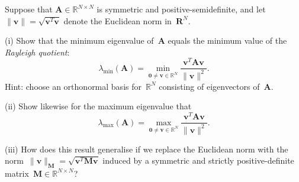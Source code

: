 \begin{Exercises}

\exercise\label{ex: quadratic form}
Suppose that $\boldsymbol{A}\in\mathbb{R}^{N\times N}$ is symmetric and 
positive-semidefinite, and let 
$\|\boldsymbol{v}\|=\sqrt{\boldsymbol{v}^T\boldsymbol{v}}$ denote the 
Euclidean norm in~$\boldsymbol{R}^N$.  
\begin{description}
\item{(i)}
Show that the minimum eigenvalue of~$\boldsymbol{A}$ equals the minimum value 
of the \emph{Rayleigh quotient}:
\[
\lambda_{\min}(\boldsymbol{A})
    =\min_{\boldsymbol{0}\ne\boldsymbol{v}\in\mathbb{R}^N}
    \frac{\boldsymbol{v}^T\boldsymbol{A}\boldsymbol{v}}{\|\boldsymbol{v}\|^2}.
\]
Hint: choose an orthonormal basis for~$\mathbb{R}^N$ consisting of eigenvectors 
of~$\boldsymbol{A}$.
\item{(ii)} Show likewise for the maximum eigenvalue that
\[
\lambda_{\max}(\boldsymbol{A})
    =\max_{\boldsymbol{0}\ne\boldsymbol{v}\in\mathbb{R}^N}
    \frac{\boldsymbol{v}^T\boldsymbol{A}\boldsymbol{v}}{\|\boldsymbol{v}\|^2}.
\]
\item{(iii)} How does this result generalise if we replace the Euclidean norm 
with the norm~$\|\boldsymbol{v}\|_{\boldsymbol{M}}=\sqrt{\boldsymbol{v}^T
\boldsymbol{M}\boldsymbol{v}}$ induced by a symmetric and strictly 
positive-definite matrix~$\boldsymbol{M}\in\mathbb{R}^{N\times N}$?
\end{description}


\end{Exercises}
